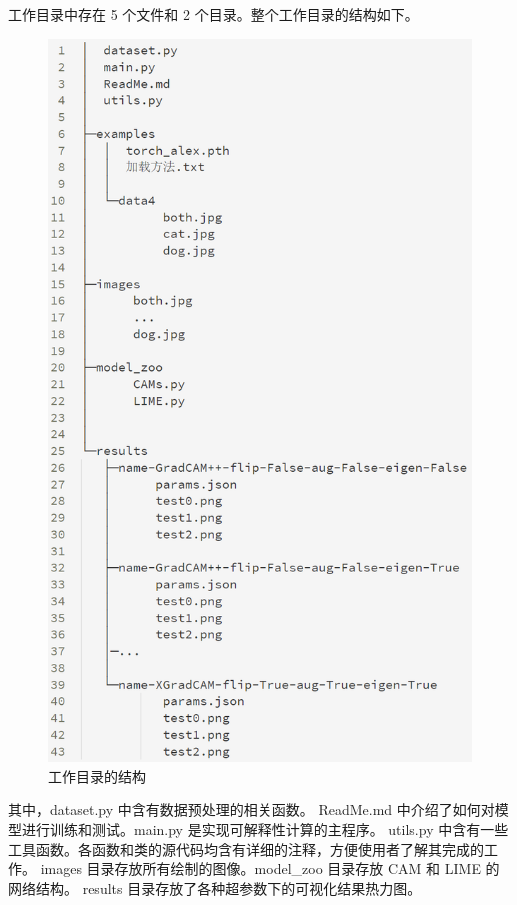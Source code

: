 \documentclass[supercite]{Experimental_Report}
\theoremstyle{definition}
\begin{document}
工作目录中存在 5 个文件和 2 个目录。整个工作目录的结构如下。
\begin{figure}[H]
	\begin{center}
		\includegraphics[scale=0.5]{../images/tree.png}
		\caption{工作目录的结构}
	\end{center}
\end{figure}

其中，dataset.py 中含有数据预处理的相关函数。
ReadMe.md 中介绍了如何对模型进行训练和测试。main.py 是实现可解释性计算的主程序。
utils.py 中含有一些工具函数。各函数和类的源代码均含有详细的注释，方便使用者了解其完成的工作。
images 目录存放所有绘制的图像。model\_zoo 目录存放 CAM 和 LIME 的网络结构。
results 目录存放了各种超参数下的可视化结果热力图。



\end{document}
